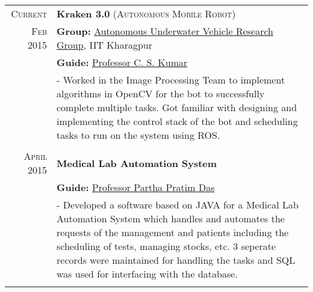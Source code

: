 \documentclass[a4paper,10pt]{extarticle} %
\begin{document}
\begin{tabular}{r|p{16cm}}
\textsc{Current} & \textbf{Kraken 3.0} \textsc{(Autonomous Mobile Robot)} \\
\textsc{Feb 2015} & \textbf{Group: }\textmd{\href{http://auv-iitkgp.in/}{Autonomous Underwater Vehicle Research Group}}, IIT Kharagpur\\
& \textbf{Guide: }\textmd{\href{http://iitkgp.ac.in/fac-profiles/showprofile.php?empcode=aWmdU}{Professor C. S. Kumar}}\\
& \footnotesize{- Worked in the Image Processing Team to implement algorithms in OpenCV for the bot to successfully complete multiple tasks. Got familiar with designing and implementing the control stack of the bot and scheduling tasks to run on the system using ROS.}\\
\multicolumn{2}{c}{} \\


\textsc{April 2015} & \textbf{Medical Lab Automation System}\\
& \textbf{Guide: }\textmd{\href{http://www.iitkgp.ac.in/fac-profiles/showprofile.php?empcode=SSmUZ}{Professor Partha Pratim Das}}\\
& \footnotesize{- Developed a software based on JAVA for a Medical Lab Automation System which handles and automates the requests of the management and patients including the scheduling of tests, managing stocks, etc. 3 seperate records were maintained for handling the tasks and SQL was used for interfacing with the database.}\\
\multicolumn{2}{c}{} \\


\end{tabular}
\end{document}

